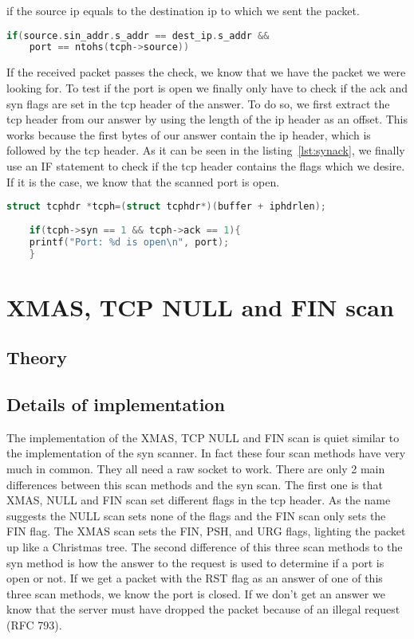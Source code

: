 	if the source ip equals to the destination ip to which we sent the packet.
	\begin{lstlisting}[frame= single, language=C, caption= IF statement to check origin of packet, label=lst:checkorigin]
	if(source.sin_addr.s_addr == dest_ip.s_addr &&
	port == ntohs(tcph->source))
	\end{lstlisting}
	If the received packet passes the check, we know that we have the packet we were looking for. To test if the port is open we finally only have to check if the ack and syn flags are set in the tcp header
	of the answer. To do so, we first extract the tcp header from our answer by using the length of the ip header as an offset. This works because the first bytes of our answer contain the ip header, which
	is followed by the tcp header. As it can be seen in the listing~\ref{lst:synack}, we finally use an IF statement to check if the tcp header contains the flags which we desire. If it is the case, we know that the scanned
	port is open.
	\begin{lstlisting}[frame= single, language=C, caption=C code to check if answer contains syn and ack flag, label=lst:synack]
	struct tcphdr *tcph=(struct tcphdr*)(buffer + iphdrlen);
	
	if(tcph->syn == 1 && tcph->ack == 1){
	printf("Port: %d is open\n", port);
	} 
	\end{lstlisting}
	\section{XMAS, TCP NULL and FIN scan}
		\label{sec:xmas}
		\subsection{Theory}
		
		\subsection{Details of implementation}
		The implementation of the XMAS, TCP NULL and FIN scan is quiet similar to the implementation of the syn scanner. In fact these four scan methods have very much in common.
		They all need a raw socket to work. There are only 2 main differences between this scan methods and the syn scan. The first one is that XMAS, NULL and FIN scan set different flags
		in the tcp header. As the name suggests the NULL scan sets none of the flags and the FIN scan only sets the FIN flag. The XMAS scan sets the FIN, PSH, and URG flags, lighting the packet up like a Christmas tree.
		The second difference of this three scan methods to the syn method is how the answer to the request is used to determine if a port is open or not. If we get a packet with the RST flag as an answer of one
		of this three scan methods, we know the port is closed. If we don't get an answer we know that the server must have dropped the packet because of an illegal request (RFC 793).
		
		